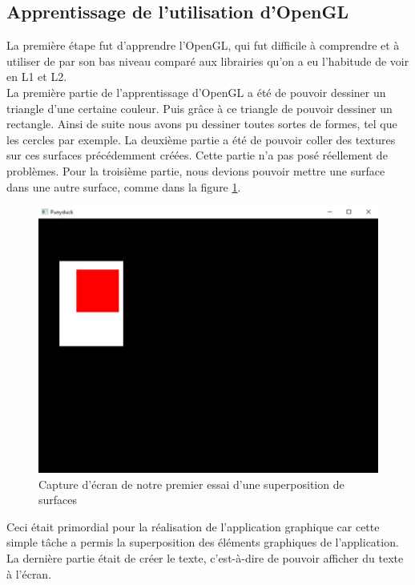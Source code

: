 \documentclass{report}
\begin{document}
\subsection{Apprentissage de l'utilisation d'OpenGL}
La première étape fut d'apprendre l'OpenGL, qui fut difficile à comprendre et à utiliser de par son bas niveau comparé aux librairies qu'on a eu l'habitude de voir en L1 et L2. \\
La première partie de l'apprentissage d'OpenGL a été de pouvoir dessiner un triangle d'une certaine couleur. Puis grâce à ce triangle de pouvoir dessiner un rectangle. Ainsi de suite nous avons pu dessiner toutes sortes de formes, tel que les cercles par exemple.
La deuxième partie a été de pouvoir coller des textures sur ces surfaces précédemment créées. Cette partie n'a pas posé réellement de problèmes.
Pour la troisième partie, nous devions pouvoir mettre une surface dans une autre surface, comme dans la figure \ref{exsurface}.
\begin{figure}
    \begin{center}
        \includegraphics[scale=0.3]{exempleSurface.jpg}
        \caption{Capture d'écran de notre premier essai d'une superposition de surfaces}
        \label{exsurface}
    \end{center}
\end{figure}
Ceci était primordial pour la réalisation de l'application graphique car cette simple tâche a permis la superposition des éléments graphiques de l'application. \\
La dernière partie était de créer le texte, c'est-à-dire de pouvoir afficher du texte à l'écran. \\
\end{document}
